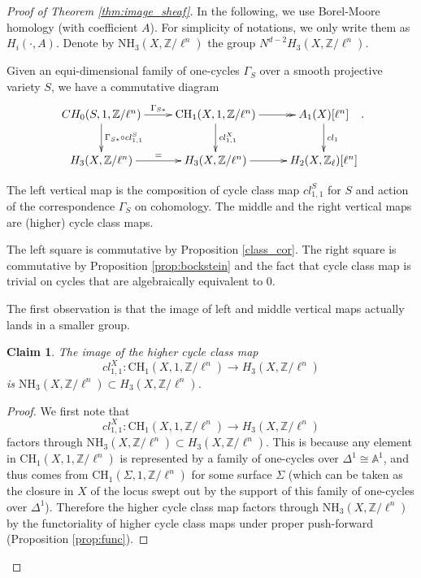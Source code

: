 \documentclass{amsart}
\newtheorem{claim}[theorem]{Claim}
\theoremstyle{definition}
\theoremstyle{remark}
\newcommand{\mbb}{\mathbb}
\newcommand{\ZZ}{\mbb{Z}}
\newcommand{\AAA}{\mbb{A}}
\begin{document}
\begin{proof}[Proof of Theorem {\ref{thm:image_sheaf}}]
In the following, we use Borel-Moore homology (with coefficient $A$). 
For simplicity of notations, we only write them as $H_i(\cdot, A)$.
Denote by $\text{NH}_3(X, \ZZ/\ell^n)$ the group $N^{d-2}H_3(X, \ZZ/\ell^n)$.



Given an equi-dimensional family of one-cycles $\Gamma_S$ over a smooth projective variety $S$, we have a commutative diagram
\begin{equation}\label{eq:cd1}
\xymatrix{
 CH_0(S,1, \ZZ/\ell^n) \ar[r]^{ \Gamma_{S*}}\ar[d]^{ \Gamma_{S*}\circ cl^S_{1, 1}} &\text{CH}_1(X, 1, \ZZ/\ell^n) \ar@{->>}[r]\ar[d]^{cl_{1, 1}^X} &A_1(X)[\ell^n] \ar[d]^{cl_{1}}\\
   H_3(X, \ZZ/\ell^n)  \ar[r]^= & H_3(X, \ZZ/\ell^n) \ar[r] & H_2(X, \ZZ_\ell)[\ell^n]}.
\end{equation}

The left vertical map is the composition of cycle class map $cl^S_{1, 1}$ for $S$ and action of the correspondence $\Gamma_S$ on cohomology.
The middle and the right vertical maps are (higher) cycle class maps. 

The left square is commutative by Proposition \ref{class_cor}. The right square is commutative by Proposition \ref{prop:bockstein} and the fact that cycle class map is trivial on cycles that are algebraically equivalent to $0$.

The first observation is that the image of left and middle vertical maps actually lands in a smaller group.

\begin{claim}\label{claim:mid}
    The image of the higher cycle class map
\[
cl_{1, 1}^X: \text{CH}_1(X, 1, \ZZ/\ell^n) \to H_3(X, \ZZ/\ell^n)
\]
is $\text{NH}_3(X, \ZZ/\ell^n)\subset H_3(X, \ZZ/\ell^n)$.
\end{claim}
\begin{proof}
We first note that \[
cl_{1, 1}^X: \text{CH}_1(X, 1, \ZZ/\ell^n) \to H_3(X, \ZZ/\ell^n)
\]
factors through $\text{NH}_3(X, \ZZ/\ell^n)\subset H_3(X, \ZZ/\ell^n)$.
This is because any element in $\text{CH}_1(X, 1, \ZZ/\ell^n)$ is represented by a family of  one-cycles over $\Delta^1\cong \AAA^1$, and thus comes from $\text{CH}_1(\Sigma, 1, \ZZ/\ell^n)$ for some surface $\Sigma$ (which can be taken as the closure in $X$ of the locus swept out by the support of this family of one-cycles over $\Delta^1$). Therefore the higher cycle class map factors through $\text{NH}_3(X, \ZZ/\ell^n)$ by the functoriality of higher cycle class maps under proper push-forward (Proposition \ref{prop:func}).


\end{proof}
\end{proof}
\end{document}
